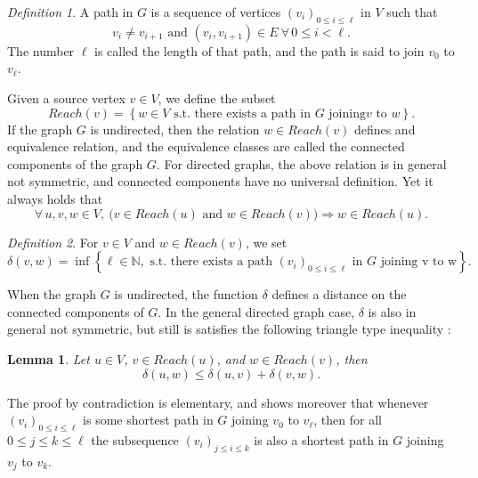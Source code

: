\documentclass[12pt]{article}
\theoremstyle{plain}
\newtheorem{lemma}{Lemma}
\theoremstyle{remark}
\newtheorem*{definition}{Definition}
\newcommand{\N}{\mathbb{N}}
\begin{document}
\begin{definition}
A path in $G$ is a sequence of vertices $(v_i)_{0\leq i \leq \ell}$ 
in $V$ such that 
$$
	v_i \neq v_{i+1} \text{ and } (v_i,v_{i+1}) \in E\ \forall\, 0\leq i < \ell.
$$
The number $\ell$ is called the length of that path, and the path is said to
join $v_0$ to $v_\ell$.
\end{definition}

Given a source vertex $v \in V$, we define the subset
$$
Reach(v) = \left\{ w \in V \text{ s.t. there exists a path in } G \text{ joining
} v \text{ to } w\right\}.
$$
If the graph $G$ is undirected, then the relation $w \in Reach(v)$ defines and
equivalence relation, and the equivalence classes are called the connected
components of the graph $G$. For directed graphs, the above relation is in general
not symmetric, and connected components have no universal definition. Yet it
always holds that 
$$
\forall\, u,v,w \in V,\ \Big(v \in Reach(u) \text{ and } w \in Reach(v) \Big)
\Rightarrow w \in Reach(u).
$$

\begin{definition}
For $v \in V$ and $w \in Reach(v)$, we set
$$
	\delta(v, w) = \inf\left\{ \ell \in \N, \text{ s.t. there exists a path
	} (v_i)_{0\leq i \leq \ell} \text{ in } G \text{ joining  v to
	w}\right\}.
$$
\end{definition}

When the graph $G$ is undirected, the function $\delta$ defines a distance on
the connected components of $G$. In the general directed graph case, $\delta$ is 
also in general not symmetric, but still is satisfies the following triangle
type inequality : 

\begin{lemma}\label{lem:trineq}
	Let $u \in V$, $v \in Reach(u)$, and $w \in Reach(v)$, then 
	$$
	\delta(u,w) \leq \delta(u,v) + \delta(v,w).
	$$
\end{lemma}

The proof by contradiction is elementary, and shows moreover that whenever 
$(v_i)_{0\leq i \leq \ell}$ is some shortest path in $G$ joining $v_0$ to
$v_{\ell}$, then for all $0\leq j \leq k \leq \ell$ the subsequence 
$(v_i)_{j \leq i \leq k}$ is also a shortest path in $G$ joining $v_j$ 
to $v_k$. 

\medskip
\end{document}
